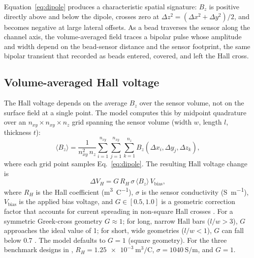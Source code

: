 \documentclass[pdflatex,sn-basic]{sn-jnl}
\theoremstyle{thmstyleone}
\theoremstyle{thmstyletwo}
\theoremstyle{thmstylethree}
\begin{document}
Equation~\eqref{eq:dipole} produces a characteristic spatial signature: $B_z$ is positive directly above and below the dipole, crosses zero at $\Delta z^2 = (\Delta x^2 + \Delta y^2)/2$, and becomes negative at large lateral offsets. As a bead traverses the sensor along the channel axis, the volume-averaged field traces a bipolar pulse whose amplitude and width depend on the bead-sensor distance and the sensor footprint, the same bipolar transient that \citet{aledealat2009} recorded as beads entered, covered, and left the Hall cross.

\subsection{Volume-averaged Hall voltage}\label{sec:hallvoltage}

The Hall voltage depends on the average $B_z$ over the sensor volume, not on the surface field at a single point. The model computes this by midpoint quadrature over an $n_{xy} \times n_{xy} \times n_z$ grid spanning the sensor volume (width $w$, length $l$, thickness $t$):
\begin{equation}
\langle B_z \rangle = \frac{1}{n_{xy}^2\, n_z} \sum_{i=1}^{n_{xy}} \sum_{j=1}^{n_{xy}} \sum_{k=1}^{n_z} B_z(\Delta x_i, \Delta y_j, \Delta z_k),
\label{eq:avgbz}
\end{equation}
where each grid point samples Eq.~\eqref{eq:dipole}. The resulting Hall voltage change is
\begin{equation}
\Delta V_H = G \, R_H \, \sigma \, \langle B_z \rangle \, V_{\text{bias}},
\label{eq:vh}
\end{equation}
where $R_H$ is the Hall coefficient (\si{\meter\cubed\per\coulomb}), $\sigma$ is the sensor conductivity (\si{\siemens\per\meter}), $V_{\text{bias}}$ is the applied bias voltage, and $G \in [0.5, 1.0]$ is a geometric correction factor that accounts for current spreading in non-square Hall crosses \citep{popovic2004}. For a symmetric Greek-cross geometry $G \approx 1$; for long, narrow Hall bars ($l/w > 3$), $G$ approaches the ideal value of 1; for short, wide geometries ($l/w < 1$), $G$ can fall below 0.7 \citep{popovic2004}. The model defaults to $G = 1$ (square geometry). For the three benchmark designs in \citet{govindaraju2025}, $R_H = \SI{1.25e-3}{\meter\cubed\per\coulomb}$, $\sigma = \SI{1040}{\siemens\per\meter}$, and $G = 1$.
\end{document}
